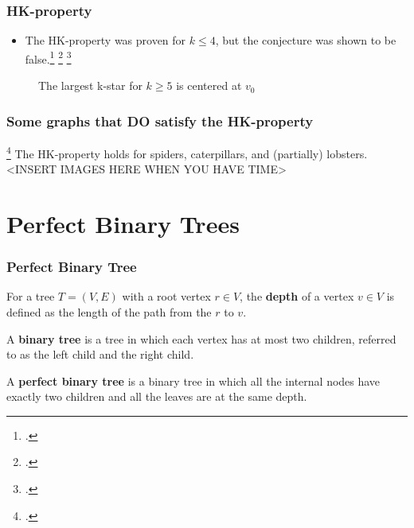 \documentclass[10pt,]{beamer}
\theoremstyle{mystyle}
\begin{document}
\begin{frame}\frametitle{HK-property}
    \begin{itemize}
        \item The HK-property was proven for $k \leq 4$, but the conjecture was shown to be false.\footcite{MR2523796} \footcite{MR3612439} \footcite{MR3271819}
    \end{itemize}

    \begin{figure}
        \centering
        \caption*{The largest k-star for $k \geq 5$ is centered at $v_0$}
    \end{figure}
\end{frame}

\begin{frame}\frametitle{Some graphs that DO satisfy the HK-property}
    \footcite{MR4245360} The HK-property holds for spiders, caterpillars, and (partially) lobsters.
    <INSERT IMAGES HERE WHEN YOU HAVE TIME>
\end{frame}

\section{Perfect Binary Trees}
\begin{frame}\frametitle{Perfect Binary Tree}
    \begin{definition}
        For a tree $T = (V, E)$ with a root vertex $r \in V$, the \textbf{depth} of a vertex $v \in V$ is defined as the length of the path from the $r$ to $v$.
    \end{definition}
    \begin{definition}
        A \textbf{binary tree} is a tree in which each vertex has at most two children, referred to as the left child and the right child.
    \end{definition}
    \begin{definition}
        A \textbf{perfect binary tree} is a binary tree in which all the internal nodes have exactly two children and all the leaves are at the same depth.
    \end{definition}
\end{frame}
\end{document}
